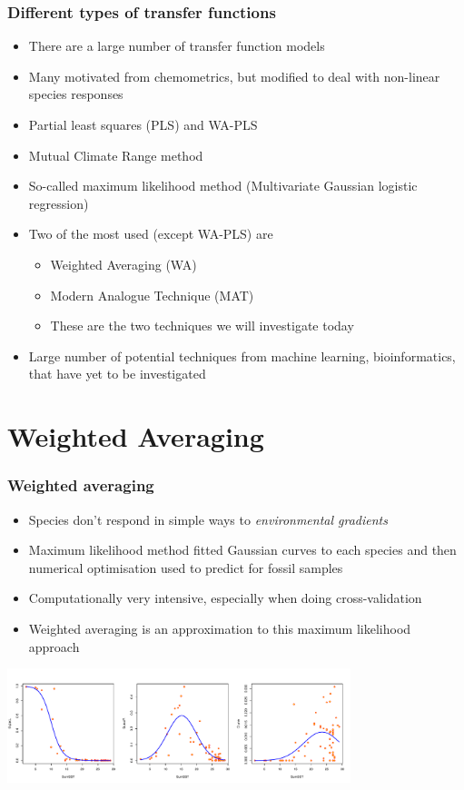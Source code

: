 \documentclass{beamer}
\begin{document}
\begin{frame}
    \frametitle{Different types of transfer functions}
    \begin{itemize}
        \item There are a large number of transfer function models
        \item Many motivated from chemometrics, but modified to deal with non-linear species responses
        \item Partial least squares (PLS) and WA-PLS
        \item Mutual Climate Range method
        \item So-called maximum likelihood method (Multivariate Gaussian logistic regression)
        \item Two of the most used (except WA-PLS) are
        \begin{itemize}
            \item Weighted Averaging (WA)
            \item Modern Analogue Technique (MAT)
            \item These are the two techniques we will investigate today
        \end{itemize}
        \item Large number of potential techniques from machine learning, bioinformatics, that have yet to be investigated
    \end{itemize}
\end{frame}

\section{Weighted Averaging}
\begin{frame}
    \frametitle{Weighted averaging}
    \begin{itemize}
        \item Species don't respond in simple ways to \emph{environmental gradients}
        \item Maximum likelihood method fitted Gaussian curves to each species and then numerical optimisation used to predict for fossil samples
        \item Computationally very intensive, especially when doing cross-validation
        \item Weighted averaging is an approximation to this maximum likelihood approach
    \end{itemize}
    \begin{center}
        \includegraphics[width=10cm]{three_forams_gauss}
    \end{center}
\end{frame}
\end{document}

